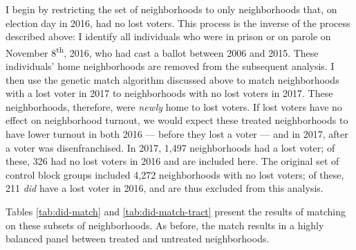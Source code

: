 \documentclass[12pt,]{article}
\begin{document}
I begin by restricting the set of neighborhoods to only neighborhoods that, on election day in 2016, had no lost voters. This process is the inverse of the process described above: I identify all individuals who were in prison or on parole on November 8\textsuperscript{th}, 2016, who had cast a ballot between 2006 and 2015. These individuals' home neighborhoods are removed from the subsequent analysis. I then use the genetic match algorithm discussed above to match neighborhoods with a lost voter in 2017 to neighborhoods with no lost voters in 2017. These neighborhoods, therefore, were \emph{newly} home to lost voters. If lost voters have no effect on neighborhood turnout, we would expect these treated neighborhoods to have lower turnout in both 2016 --- before they lost a voter --- and in 2017, after a voter was disenfranchised. In 2017, 1,497 neighborhoods had a lost voter; of these, 326 had no lost voters in 2016 and are included here. The original set of control block groups included 4,272 neighborhoods with no lost voters; of these, 211 \emph{did} have a lost voter in 2016, and are thus excluded from this analysis.

Tables \ref{tab:did-match} and \ref{tab:did-match-tract} present the results of matching on these subsets of neighborhoods. As before, the match results in a highly balanced panel between treated and untreated neighborhoods.
\end{document}

